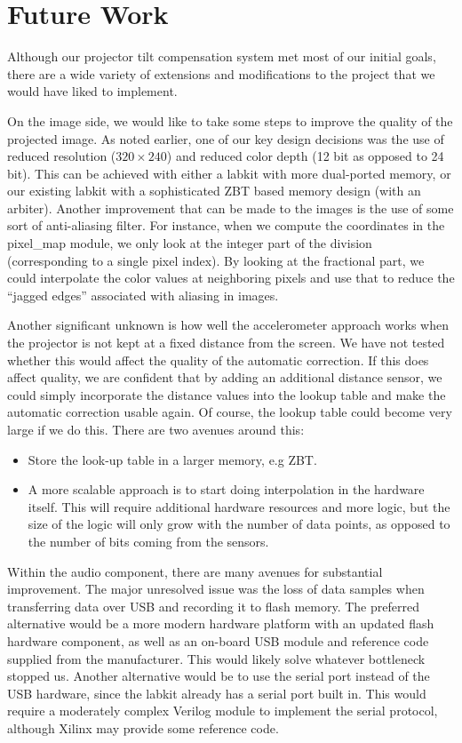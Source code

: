\documentclass{article}
\begin{document}
\section{Future Work}
Although our projector tilt compensation system met most of our initial goals,
there are a wide variety of extensions and modifications to the project that we would have liked to implement.

On the image side, we would like to take some steps to improve the quality of the projected image.
As noted earlier, one of our key design decisions was the use of reduced resolution ($320 \times 240$) and reduced color depth (12 bit as opposed to 24 bit).
This can be achieved with either a labkit with more dual-ported memory, or our existing labkit with a sophisticated ZBT based memory design (with an arbiter).
Another improvement that can be made to the images is the use of some sort of anti-aliasing filter.
For instance, when we compute the coordinates in the pixel\_map module, we only look at the integer part of the division (corresponding to a single pixel index).
By looking at the fractional part, we could interpolate the color values at neighboring pixels and use that to reduce the ``jagged edges'' associated with aliasing in images.

Another significant unknown is how well the accelerometer approach works when the projector is not kept at a fixed distance from the screen.
We have not tested whether this would affect the quality of the automatic correction.
If this does affect quality, we are confident that by adding an additional distance sensor,
we could simply incorporate the distance values into the lookup table and make the automatic correction usable again.
Of course, the lookup table could become very large if we do this.
There are two avenues around this:
\begin{itemize}
    \item Store the look-up table in a larger memory, e.g ZBT.
    \item A more scalable approach is to start doing interpolation in the hardware itself.
        This will require additional hardware resources and more logic,
        but the size of the logic will only grow with the number of data points,
        as opposed to the number of bits coming from the sensors.
\end{itemize}

Within the audio component, there are many avenues for substantial improvement.
The major unresolved issue was the loss of data samples when transferring data over USB and recording it to flash memory.
The preferred alternative would be a more modern hardware platform with an updated flash hardware component,
as well as an on-board USB module and reference code supplied from the manufacturer.
This would likely solve whatever bottleneck stopped us.
Another alternative would be to use the serial port instead of the USB hardware, since the labkit already has a serial port built in.
This would require a moderately complex Verilog module to implement the serial protocol, although Xilinx may provide some reference code.
\end{document}
